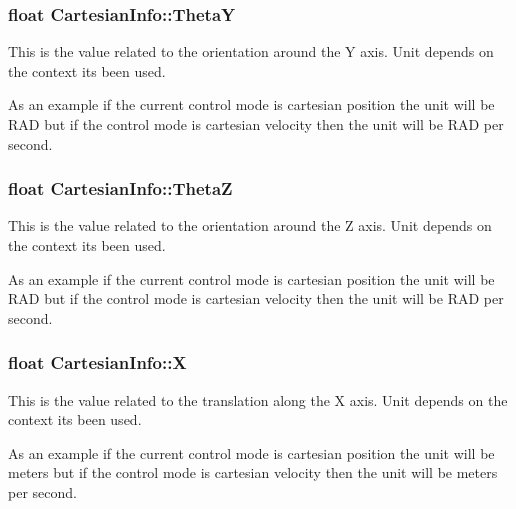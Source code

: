 \subsubsection[{\texorpdfstring{ThetaY}{ThetaY}}]{\setlength{\rightskip}{0pt plus 5cm}float Cartesian\+Info\+::\+ThetaY}\hypertarget{struct_cartesian_info_a4aef5897f4cdcf7ecc9df6804f844d46}{}\label{struct_cartesian_info_a4aef5897f4cdcf7ecc9df6804f844d46}


This is the value related to the orientation around the Y axis. Unit depends on the context it\textquotesingle{}s been used. 

As an example if the current control mode is cartesian position the unit will be R\+AD but if the control mode is cartesian velocity then the unit will be R\+AD per second. 
\subsubsection[{\texorpdfstring{ThetaZ}{ThetaZ}}]{\setlength{\rightskip}{0pt plus 5cm}float Cartesian\+Info\+::\+ThetaZ}\hypertarget{struct_cartesian_info_a2890c501f3b7b9479e12ad51f04f0a7f}{}\label{struct_cartesian_info_a2890c501f3b7b9479e12ad51f04f0a7f}


This is the value related to the orientation around the Z axis. Unit depends on the context it\textquotesingle{}s been used. 

As an example if the current control mode is cartesian position the unit will be R\+AD but if the control mode is cartesian velocity then the unit will be R\+AD per second. 
\subsubsection[{\texorpdfstring{X}{X}}]{\setlength{\rightskip}{0pt plus 5cm}float Cartesian\+Info\+::X}\hypertarget{struct_cartesian_info_a212cc2dcae1697132fc31fa2f5d17269}{}\label{struct_cartesian_info_a212cc2dcae1697132fc31fa2f5d17269}


This is the value related to the translation along the X axis. Unit depends on the context it\textquotesingle{}s been used. 

As an example if the current control mode is cartesian position the unit will be meters but if the control mode is cartesian velocity then the unit will be meters per second. 
